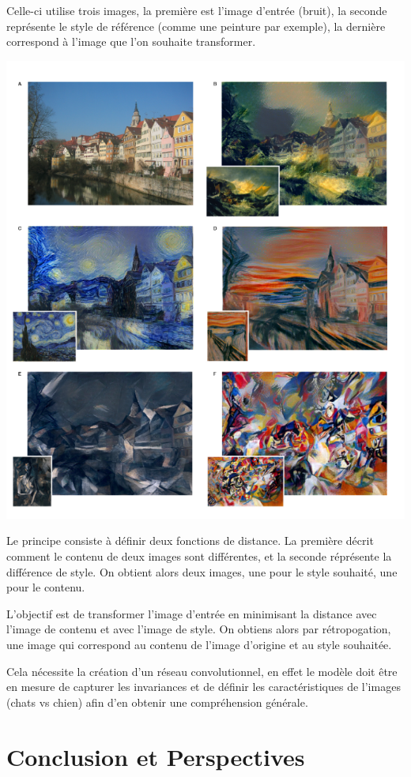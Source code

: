 \documentclass[a4paper, 12pt]{book}
\begin{document}
Celle-ci utilise trois images, la première est l'image d'entrée (bruit), la seconde représente le style de référence (comme une peinture par exemple), la dernière correspond à l'image que l'on souhaite transformer.

\includegraphics[width=0.7\linewidth]{images/neuronal-algorithm-artistic-style.png}

Le principe consiste à définir deux fonctions de distance. La première décrit comment le contenu de deux images sont différentes, et la seconde réprésente la différence de style. On obtient alors deux images, une pour le style souhaité, une pour le contenu.

L'objectif est de transformer l'image d'entrée en minimisant la distance avec l'image de contenu et avec l'image de style. On obtiens alors par rétropogation, une image qui correspond au contenu de l'image d'origine et au style souhaitée.

Cela nécessite la création d'un réseau convolutionnel, en effet le modèle doit être en mesure de capturer les invariances et de définir les caractéristiques de l'images (chats vs chien) afin d'en obtenir une compréhension générale.



\chapter{Conclusion et Perspectives\label{chap-conclusion}}



\end{document}
